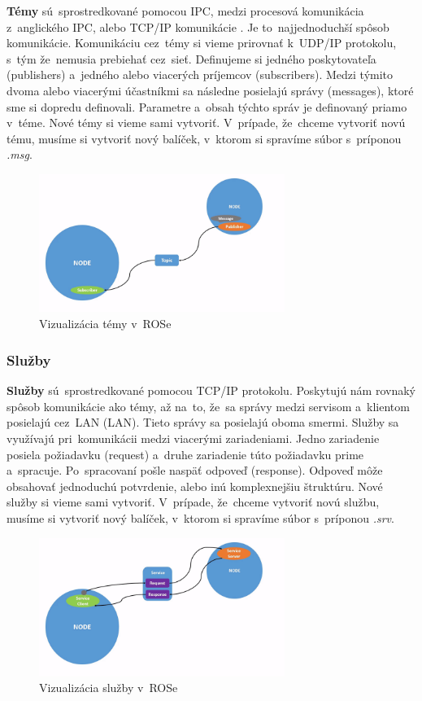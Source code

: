 	\textbf {Témy} sú~sprostredkované pomocou IPC, medzi procesová komunikácia z~anglického \acrlong{IPC},
	alebo TCP/IP komunikácie . Je to~najjednoduchší spôsob komunikácie. Komunikáciu cez~témy si vieme prirovnať k~UDP/IP
	protokolu, s~tým že~nemusia prebiehať cez~sieť. Definujeme si jedného poskytovateľa (publishers) a~jedného
	alebo viacerých príjemcov (subscribers). Medzi týmito dvoma alebo viacerými účastníkmi sa následne
	posielajú správy (messages), ktoré sme si dopredu definovali. Parametre a~obsah týchto správ je
	definovaný priamo v~téme. Nové témy si vieme sami vytvoriť. V~prípade, že~chceme vytvoriť novú tému, musíme
	si vytvoriť nový balíček, v~ktorom si spravíme súbor s~príponou \textit{.msg}.

	\begin{figure}[!htbp]
		\centering
		\includegraphics[width=8cm]{img/topicsExplanation.png}
		\caption{Vizualizácia témy v~ROSe~\cite{RosDoc}}
		\label{fig:topics}
	\end{figure}

\clearpage

\subsubsection{Služby}
\label{sec:services}

	\textbf {Služby} sú~sprostredkované pomocou TCP/IP protokolu. Poskytujú nám rovnaký spôsob komunikácie ako témy, až na~to, že~sa správy
	medzi servisom a~klientom posielajú cez~LAN (\acrlong{LAN}). Tieto správy sa posielajú oboma smermi. Služby sa využívajú pri~komunikácii
	medzi viacerými zariadeniami. Jedno zariadenie posiela požiadavku (request) a~druhe zariadenie túto požiadavku prime
	a~spracuje. Po~spracovaní pošle naspäť odpoveď (response). Odpoveď môže obsahovať jednoduchú potvrdenie, alebo inú
	komplexnejšiu štruktúru. Nové služby si vieme sami vytvoriť. V~prípade, že~chceme vytvoriť novú službu, musíme
	si vytvoriť nový balíček, v~ktorom si spravíme súbor s~príponou \textit{.srv}.

	\begin{figure}[!htbp]
		\centering
		\includegraphics[width=8cm]{img/serviceExplanation.png}
		\caption{Vizualizácia služby v~ROSe~\cite{RosDoc}}
		\label{fig:service}
	\end{figure}


